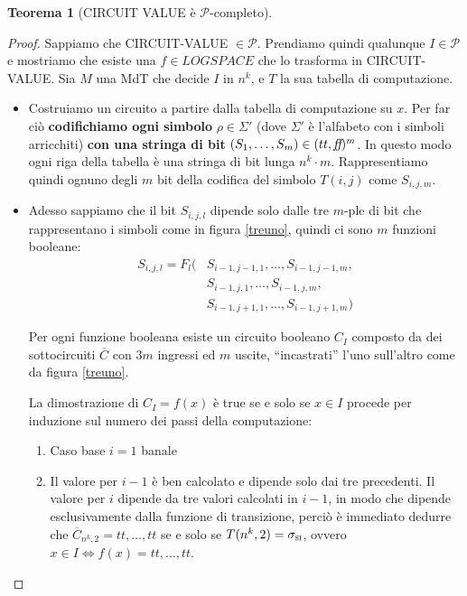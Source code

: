 \documentclass[a4paper,10pt,oneside]{article}
\theoremstyle{break}
\newtheorem{teo}{Teorema}[subsection]
\newcommand{\SI}{\textsc{si}}
\begin{document}
\begin{mdframed}
\begin{teo}[CIRCUIT VALUE è $\mathcal{P}$-completo]
\end{teo}

\dotfill

\begin{proof}
Sappiamo che CIRCUIT-VALUE $\in \mathcal P$. Prendiamo quindi qualunque $I \in \mathcal P$ e mostriamo che esiste una $f \in LOGSPACE$ che lo trasforma in CIRCUIT-VALUE. Sia $M$ una MdT che decide $I$ in $n^k$, e $T$ la sua tabella di computazione.

\begin{itemize}
 \item Costruiamo un circuito a partire dalla tabella di computazione su $x$. Per far ciò \textbf{codifichiamo ogni simbolo} $\rho \in \Sigma'$ (dove $\Sigma'$ è l'alfabeto con i simboli arricchiti) \textbf{con una stringa di bit} $(S_1, \hdots, S_m) \in (tt, \emph{ff})^m$. In questo modo ogni riga della tabella è una stringa di bit lunga $n^k \cdot m$. Rappresentiamo quindi ognuno degli $m$ bit della codifica del simbolo $T(i, j)$ come $S_{i, j, m}$.
 \item Adesso sappiamo che il bit $S_{i, j, l}$ dipende solo dalle tre $m$-ple di bit che rappresentano i simboli come in figura \ref{treuno}, quindi ci sono $m$ funzioni booleane:
 \[ \begin{aligned}
                   S_{i, j, l} = F_l( &S_{i-1, j-1, 1}, \hdots, S_{i-1, j-1, m},\\
                        &S_{i-1, j, 1}, \hdots, S_{i-1, j, m},\\
                        &S_{i-1, j+1, 1}, \hdots, S_{i-1, j+1, m})
                  \end{aligned}
 \]

 Per ogni funzione booleana esiste un circuito booleano $C_I$ composto da dei sottocircuiti $\overline C$ con $3m$ ingressi ed $m$ uscite, ``incastrati'' l'uno sull'altro come da figura \ref{treuno}. \smallskip

 La dimostrazione di $C_I = f(x)$ è true se e solo se $x \in I$ procede per induzione sul numero dei passi della computazione:
 \begin{enumerate}
  \item Caso base $i = 1$ banale
  \item Il valore per $i-1$ è ben calcolato e dipende solo dai tre precedenti. Il valore per $i$ dipende da tre valori calcolati in $i-1$, in modo che dipende esclusivamente dalla funzione di transizione, perciò è immediato dedurre che $\overline C_{n^k, 2} = tt, \hdots, tt$ se e solo se $T(n^k, 2) = \sigma_\SI$, ovvero $x \in I \iff f(x) = tt, \hdots, tt$.


\end{enumerate}
\end{itemize}
\end{proof}
\end{mdframed}
\end{document}

